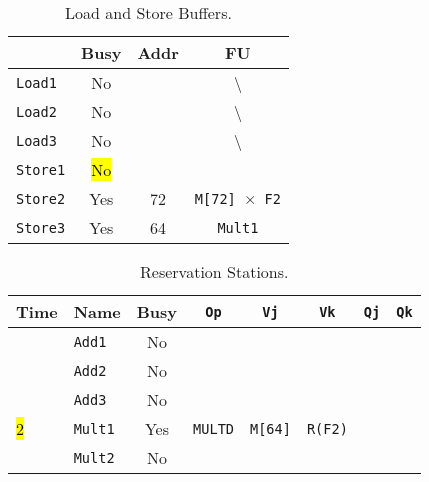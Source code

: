 \begin{enumerate}
    \begin{table}[!htp]
        \centering
        \begin{tabular}{@{} l | c c c @{}}
            \toprule
                                & Busy      & Addr      & FU   \\
            \midrule
            \texttt{Load1}      & No        &           & \textbackslash                    \\ [.3em]
            \texttt{Load2}      & No        &           & \textbackslash                    \\ [.3em]
            \texttt{Load3}      & No        &           & \textbackslash                    \\
            \cmidrule{1-4}
            \texttt{Store1}     & \hl{No}   &           &                                   \\ [.3em]
            \texttt{Store2}     & Yes       & 72        & \texttt{M[72] $\times$ F2}        \\ [.3em]
            \texttt{Store3}     & Yes       & 64        & \texttt{Mult1}                    \\
            \bottomrule
        \end{tabular}
        \caption*{Load and Store Buffers.}
    \end{table}

    \begin{table}[!htp]
        \centering
        \begin{tabular}{@{} l l | c c c c c c @{}}
            \toprule
            Time        & Name              & Busy      & \texttt{Op}           & \texttt{Vj}           & \texttt{Vk}           & \texttt{Qj}           & \texttt{Qk}       \\
            \midrule
                        & \texttt{Add1}     & No        &                       &                       &                       &                       &                   \\ [.3em]
                        & \texttt{Add2}     & No        &                       &                       &                       &                       &                   \\ [.3em]
                        & \texttt{Add3}     & No        &                       &                       &                       &                       &                   \\ [.3em]
            \hl{2}      & \texttt{Mult1}    & Yes       & \texttt{MULTD}        & \texttt{M[64]}        & \texttt{R(F2)}        &                       &                   \\ [.3em]
                        & \texttt{Mult2}    & No        &                       &                       &                       &                       &                   \\
            \bottomrule
        \end{tabular}
        \caption*{Reservation Stations.}
    \end{table}


\end{enumerate}
